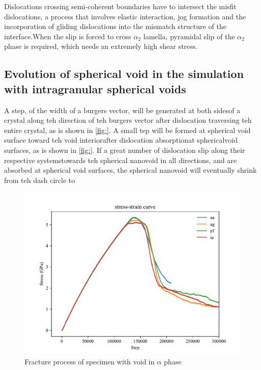 \documentclass[final,5pt,times]{elsarticle}
\begin{document}
	Dislocations crossing semi-coherent boundaries have to intersect the misfit dislocations, a process that involves elastic interaction, jog formation and the incorporation of gliding dislocations into the mismatch structure of the interface.When the slip is forced to cross $\alpha_2$ lamella, pyramidal slip of the $\alpha_2$ phase is required, which needs an extremely high shear stress.
	
	
	
	
	\subsection{Evolution of spherical void in the simulation with intragranular spherical voids}
	A step, of the width of a burgers vector, will be generated at both sidesof a crystal along teh direction of teh burgers vector after dislocation traversing teh entire crystal, as is shown in \ref{fig:}. A small tep will be formed at spherical void surface toward teh void interiorafter dislocation absorptionat sphericalvoid surfaces, as is shown in \ref{fig:}. If a great number of dislocation slip along their respective systemstowards teh spherical nanovoid in all directions, and are absorbed at spherical void surfaces, the spherical nanovoid will eventually shrink from teh dash circle to
	
	
	
	
	\begin{figure}[h]
		\centering
		\includegraphics[width=0.7\linewidth]{img/allline}
		\caption{Fracture process of specimen with void in $\alpha$ phase}
		\label{ }
	\end{figure}
	
\end{document}
